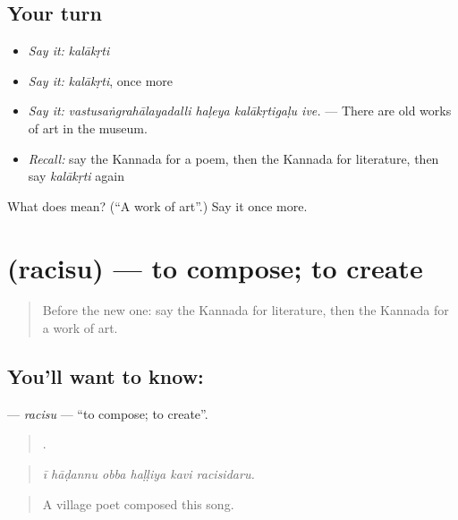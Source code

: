 \subsection*{Your turn}
\begin{itemize}
\raggedright
  \item \emph{Say it:} \emph{kalākṛti}
  \item \emph{Say it:} \emph{kalākṛti}, once more
  \item \emph{Say it:} \emph{vastusaṅgrahālayadalli haḷeya kalākṛtigaḷu ive.} — There are old works of art in the museum.
  \item \emph{Recall:} say the Kannada for a poem, then the Kannada for literature, then say \emph{kalākṛti} again
\end{itemize}

\begin{tcolorbox}[breakable,colback=teal!4,colframe=teal!35!black,title={Before you move on}]
What does  mean? (\textquotedblleft{}A work of art\textquotedblright{}.) Say it once more.
\end{tcolorbox}
\section[\texorpdfstring{\kn{ರಚಿಸು} (racisu)}{ರಚಿಸು (racisu)}]{ (racisu) — to compose; to create}

\label{lesson:KA-C537-racisu}



\begin{quote}
Before the new one: say the Kannada for literature, then the Kannada for a work of art.
\end{quote}

\subsection*{You'll want to know: }
\textbf{} — \emph{racisu} — \textquotedblleft{}to compose; to create\textquotedblright{}.

\begin{quote}
     .
\end{quote}

\begin{quote}
\emph{ī hāḍannu obba haḷḷiya kavi racisidaru.}
\end{quote}

\begin{quote}
A village poet composed this song.
\end{quote}

